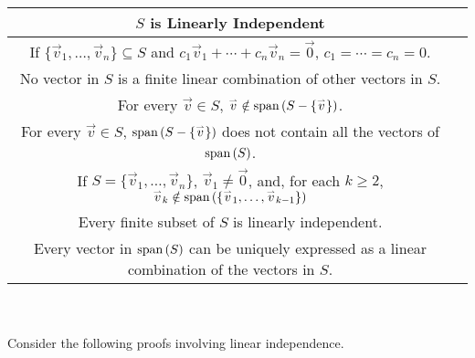         \begin{center}
            \begin{tabular}{|c|c|}
                \hline
                \hline
                \(S\) is Linearly Independent \\
                \hline
                \hline
                If \(\{\vec{v}_1,\ldots,\vec{v}_n\}\subseteq S\) and \(c_1\vec{v}_1+\cdots+c_n\vec{v}_n=\vec{0}\), \(c_1=\cdots=c_n=0\). \\
                \hline
                No vector in \(S\) is a finite linear combination of other vectors in \(S\). \\
                \hline
                For every \(\vec{v}\in S\), \(\overset{_{\rightharpoonup}}{v}\notin\text{span\,}(S-\{\overset{_{\rightharpoonup}}{v}\})\). \\
                \hline
                For every \(\vec{v}\in S\), \(\text{span\,}(S-\{\overset{_{\rightharpoonup}}{v}\})\) does not contain all the vectors of \(\text{span\,}(S)\). \\
                \hline
                If \(S=\{\vec{v}_1,\ldots,\vec{v}_n\}\), \(\vec{v}_1\neq\vec{0}\), and, for each \(k\geq 2\), \(\overset{_{\rightharpoonup}}{v}_k\notin\text{span\,}(\{\overset{_{\rightharpoonup}}{v}_1,\ldots,\overset{_{\rightharpoonup}}{v}_{k-1}\})\) \\
                \hline
                Every finite subset of \(S\) is linearly independent. \\
                \hline
                Every vector in \(\text{span\,}(S)\) can be uniquely expressed as a linear combination of the vectors in \(S\). \\
                \hline
            \end{tabular}
        \end{center}
        \vphantom
        \\
        \\
        Consider the following proofs involving linear independence.
